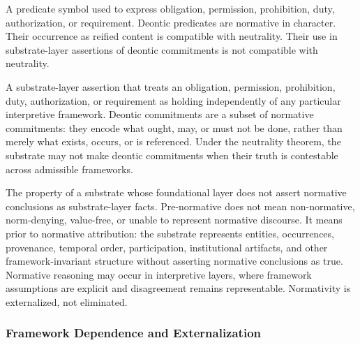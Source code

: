 \begin{description}[style=nextline,leftmargin=1.5cm]
\item[Deontic Predicate]
A predicate symbol used to express obligation,
permission, prohibition, duty, authorization,
or requirement.
Deontic predicates are normative in character.
Their occurrence as reified content is compatible
with neutrality.
Their use in substrate-layer assertions of deontic commitments
is not compatible with neutrality.

\item[Deontic Commitment]
A substrate-layer assertion that treats an obligation, permission,
prohibition, duty, authorization, or requirement as holding
independently of any particular interpretive framework.
Deontic commitments are a subset of normative commitments:
they encode what ought, may, or must not be done,
rather than merely what exists, occurs, or is referenced.
Under the neutrality theorem, the substrate may not make deontic
commitments when their truth is contestable across admissible frameworks.

\item[Pre-Normative]
The property of a substrate whose foundational layer
does not assert normative conclusions as substrate-layer facts.
Pre-normative does not mean non-normative,
norm-denying, value-free, or unable to represent normative discourse.
It means prior to normative attribution:
the substrate represents entities, occurrences,
provenance, temporal order, participation,
institutional artifacts, and other framework-invariant structure
without asserting normative conclusions as true.
Normative reasoning may occur in interpretive layers,
where framework assumptions are explicit
and disagreement remains representable.
Normativity is externalized, not eliminated.

\end{description}

\subsubsection*{Framework Dependence and Externalization}

